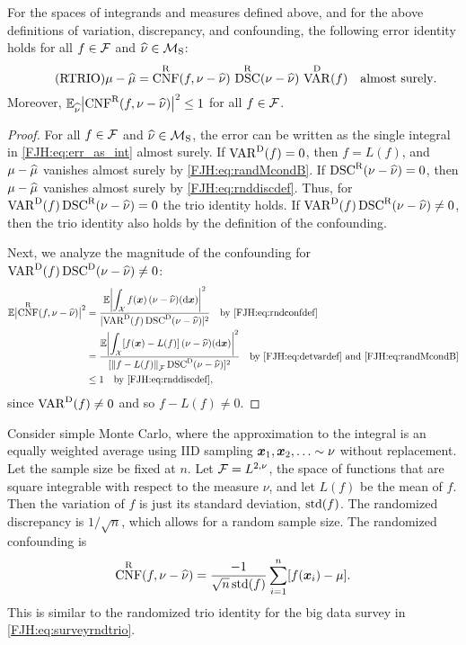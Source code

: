 \documentclass[graybox,footinfo]{svmult}
\DeclareMathOperator{\algn}{CNF}
\DeclareMathOperator{\disc}{DSC}
\DeclareMathOperator{\Var}{VAR}
\begin{document}
\begin{theorem}  \label{FJH:thm:rtrio} For the spaces of 
integrands and 
	measures defined above, and for the above definitions of variation, discrepancy, and 
	confounding, the following error identity holds for all $f \in {\mathcal{F}}$ and $\widehat{\nu}  \in 
	{\mathcal{M}}_{\textup{S}}$: 
	\begin{equation} \tag{RTRIO} \label{FJH:eq:rtrio}
	\mu - \hmu  = \algn^\Rn(f,\nu - \hnu) \, \disc^\Rn(\nu - \hnu) \, \Var^{\Dt}(f) \quad 
	\text{almost surely}.
	\end{equation}
	Moreover, $\bbE_{\hnu} \abs{\algn^\Rn(f,\nu - \hnu)}^2  \le 1$ for all $f \in 
	{\mathcal{F}}$. 
\end{theorem}
\begin{proof}  For all $f \in {\mathcal{F}}$ and $\widehat{\nu}  \in {\mathcal{M}}_{\textup{S}}$, the error can be 
written as the single integral in \eqref{FJH:eq:err_as_int} almost surely. 	If $\Var^{\Dt}(f) 
= 0$, then $f = L(f)$, and $\mu - \widehat{\mu}$ vanishes almost surely by
\eqref{FJH:eq:randMcondB}.  If 
$\disc^\Rn(\nu - \hnu) = 0$, then $\mu - \widehat{\mu}$
	vanishes almost surely by \eqref{FJH:eq:rnddiscdef}.  Thus, for $\Var^{\Dt}(f) 
	\disc^\Rn(\nu - \hnu) = 
	0$ 
	the trio identity holds. If $\Var^{\Dt}(f) \disc^\Rn(\nu - \hnu) \ne 0$, then the trio 
	identity also holds by the definition of the confounding.
	
	Next, we analyze the magnitude of the confounding for $\Var^{\Dt}(f) \disc^\Dt(\nu - 
	\hnu) \ne 0$: 
	\begin{align*}
	\bbE \abs{\algn^\Rn(f,\nu - \hnu)}^2 & = 
	\frac{\bbE \biggl \lvert\displaystyle\int_{\calX} f(\bsx) \, (\nu - \hnu)(\D 
		\bsx) \biggr \rvert^2 }{[\Var^\Dt(f)\disc^\Dt(\nu - \hnu)]^2} \quad \text{by 
		\eqref{FJH:eq:rndconfdef}}\\
	& = \frac{\bbE \biggl \lvert\displaystyle\int_{\calX} [f(\bsx) - L(f)] \, (\nu - \hnu)(\D 
		\bsx) \biggr \rvert^2}{[\norm{f-L(f)}_{\calF}\disc^\Dt(\nu - \hnu)]^2} \quad \text{by 
		\eqref{FJH:eq:detvardef} and \eqref{FJH:eq:randMcondB}} \\
	& \le 1 \quad \text{by \eqref{FJH:eq:rnddiscdef}},
	\end{align*}
	since $\Var^{\Dt}(f) \ne 0$ and so $f - L(f) \ne 0$.
\end{proof}

Consider simple Monte Carlo, where the approximation to the integral is an equally 
weighted average using IID sampling ${\boldsymbol{x}}_1, {\boldsymbol{x}}_2, \ldots \sim 
\nu$ without 
replacement. Let the sample size be fixed at $n$.
Let ${\mathcal{F}} = L^{2,\nu}$, the space of functions that are square integrable with respect to 
the measure $\nu$, and let $L(f)$ be the mean of $f$.  Then the variation of $f$ is just 
its standard 
deviation, $\textup{std}(f)$.  The randomized discrepancy is 
$1/\sqrt{n}$, which allows for a random sample size.  The randomized 
confounding is 
\begin{align*}
\algn^\Rn(f,\nu - \hnu) = \frac{-1}{ \sqrt{n}\, \std(f)}    \sum_{i=1}^n [f(\bsx_i) - 
\mu].
\end{align*}
This is similar to the randomized trio identity for the big data survey in 
\eqref{FJH:eq:surveyrndtrio}.
\end{document}
